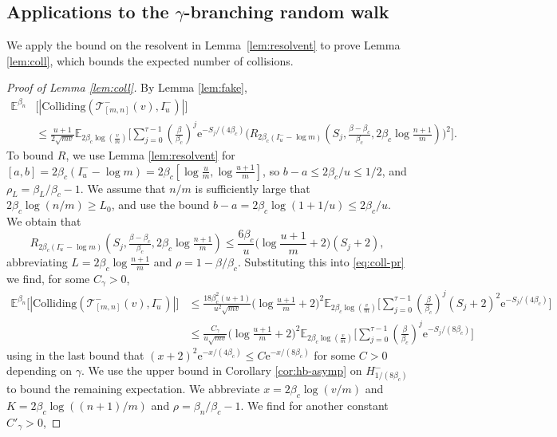 \documentclass[a4paper, a4wide, 10pt, reqno]{amsart}
\theoremstyle{plain}
\theoremstyle{definition}
\numberwithin{equation}{section}
\newcommand{\E}{\mathbb E}
\newcommand{\sT}{{\mathscr T}}
\newcommand{\re}{{\mathrm e}}
\begin{document}
\subsection{Applications to the $\gamma$-branching random walk}\label{sec:fake}
We apply the bound on the resolvent in Lemma~\ref{lem:resolvent} to prove Lemma \ref{lem:coll}, which bounds the expected number of collisions.
\begin{proof}[Proof of Lemma \ref{lem:coll}]
    By Lemma \ref{lem:fake},
    \begin{align}
        \E^{\beta_n}&\big[|\mathrm{Colliding}(\sT_{[m,n]}^-(v), I_u^-)|\big] \nonumber\\&\le\frac{u+1}{2\sqrt{mv}}\E_{2\beta_c\log (\tfrac{v}{m})}\Bigg[\sum_{j=0}^{\tau-1}(\tfrac\beta{\beta_c})^j \re^{-S_j/(4\beta_c)}\big(R_{2\beta_c(I_u^--\log m)}(S_j,\tfrac{\beta-\beta_c}{\beta_c}, 2\beta_c\log \tfrac{n+1}{m})\big)^2\Bigg].\label{eq:coll-pr}
    \end{align}
    To bound $R$, we use Lemma \ref{lem:resolvent} for $[a,b]=2\beta_c (I_u^--\log m)=2\beta_c[\log \tfrac{u}{m}, \log\tfrac{u+1}{m}]$, so $b-a\le 2\beta_c/u\le 1/2$, and $\rho_L=\beta_L/\beta_c-1$. We assume that $n/m$ is sufficiently large that $2\beta_c\log(n/m)\ge L_0$, and use the bound $b-a= 2\beta_c\log(1+1/u)\le 2\beta_c/u$.  
   We obtain
   that
    \[
    R_{2\beta_c(I_u^--\log m)}(S_j,\tfrac{\beta-\beta_c}{\beta_c}, 2\beta_c\log \tfrac{n+1}{m})
    \le 
     \frac{6\beta_c}{u}\bigg(\log\frac{u+1}{m} + 2\bigg)(S_j+2),
    \]
    abbreviating $L=2\beta_c\log \tfrac{n+1}{m}$ and $\rho=1-\beta/\beta_c$. Substituting this into \eqref{eq:coll-pr} we find,  for some $C_\gamma>0$,
    \[
    \begin{aligned}
        \E^{\beta_n}\big[|\mathrm{Colliding}(\sT_{[m,n]}^-(v), I_u^-)|\big]
        &\le \frac{18\beta_c^2(u+1)}{u^2\sqrt{mv}}\bigg(\log\frac{u+1}{m} + 2\bigg)^2\E_{2\beta_c\log (\tfrac{v}{m})}\Bigg[\sum_{j=0}^{\tau-1}(\tfrac\beta{\beta_c})^j (S_j+2)^2 \re^{-S_j/(4\beta_c)}\Bigg] \\
        &\le \frac{C_\gamma}{u\sqrt{mv}}\bigg(\log\frac{u+1}{m} + 2\bigg)^2\E_{2\beta_c\log (\tfrac{v}{m})}\Bigg[\sum_{j=0}^{\tau-1}(\tfrac\beta{\beta_c})^j  \re^{-S_j/(8\beta_c)}\Bigg]
    \end{aligned}
    \]
    using in the last bound that $(x+2)^2\re^{-x/(4\beta_c)}\le C\re^{-x/(8\beta_c)}$ for some $C>0$ depending on $\gamma$.  We use the upper bound in Corollary \ref{cor:hb-asymp} on $H^-_{1/(8\beta_c)}$ to bound the remaining expectation. We abbreviate $x=2\beta_c\log(v/m)$ and $K=2\beta_c\log((n+1)/m)$ and $\rho=\beta_n/\beta_c-1$. We find for another constant $C'_\gamma>0$,

\end{proof}
\end{document}

